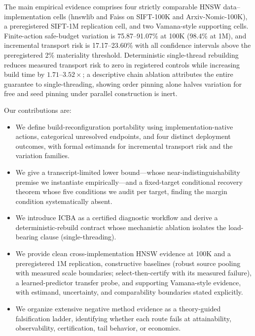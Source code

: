 \documentclass{article}
\begin{document}
The main empirical evidence comprises four strictly comparable HNSW data--implementation cells (hnswlib and
Faiss on SIFT-100K and Arxiv-Nomic-100K), a preregistered SIFT-1M replication cell, and two Vamana-style
supporting cells. Finite-action safe-budget variation is 75.87--91.07\% at 100K (98.4\% at 1M), and
incremental transport risk is 17.17--23.60\% with all confidence intervals above the preregistered 2\%
materiality threshold. Deterministic single-thread rebuilding reduces measured transport risk to zero in
registered controls while increasing build time by $1.71$--$3.52\times$; a descriptive chain ablation
attributes the entire guarantee to single-threading, showing order pinning alone halves variation for free
and seed pinning under parallel construction is inert.

Our contributions are:
\begin{itemize}\itemsep1pt
\item We define build-reconfiguration portability using implementation-native actions, categorical
unresolved endpoints, and four distinct deployment outcomes, with formal estimands for incremental
transport risk and the variation families.
\item We give a transcript-limited lower bound---whose near-indistinguishability premise we instantiate
empirically---and a fixed-target conditional recovery theorem whose five conditions we audit per target,
finding the margin condition systematically absent.
\item We introduce ICBA as a certified diagnostic workflow and derive a deterministic-rebuild contract whose
mechanistic ablation isolates the load-bearing clause (single-threading).
\item We provide clean cross-implementation HNSW evidence at 100K and a preregistered 1M replication,
constructive baselines (robust source pooling with measured scale boundaries; select-then-certify with its
measured failure), a learned-predictor transfer probe, and supporting Vamana-style evidence, with estimand,
uncertainty, and comparability boundaries stated explicitly.
\item We organize extensive negative method evidence as a theory-guided falsification ladder, identifying
whether each route fails at attainability, observability, certification, tail behavior, or economics.
\end{itemize}
\end{document}
